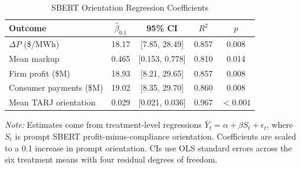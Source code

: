 \begin{table}[!t]
\centering
\caption{SBERT Orientation Regression Coefficients}
\label{tab:dose_response_summary}
\scriptsize
\renewcommand{\arraystretch}{1.05}
\setlength{\tabcolsep}{2.8pt}
\begin{tabular}{@{}lcccc@{}}
\toprule
Outcome & $\hat{\beta}_{0.1}$ & 95\% CI & $R^2$ & $p$ \\
\midrule
$\Delta P$ (\$/MWh) & 18.17 & [7.85, 28.49] & 0.857 & 0.008 \\
Mean markup & 0.465 & [0.153, 0.778] & 0.810 & 0.014 \\
Firm profit (\$M) & 18.93 & [8.21, 29.65] & 0.857 & 0.008 \\
Consumer payments (\$M) & 19.02 & [8.35, 29.70] & 0.860 & 0.008 \\
Mean TARJ orientation & 0.029 & [0.021, 0.036] & 0.967 & $<0.001$ \\
\bottomrule
\end{tabular}

\vspace{0.25em}
\begin{minipage}{0.96\columnwidth}
\footnotesize
\emph{Note:} Estimates come from treatment-level regressions $\bar{Y}_t=\alpha+\beta S_t+\epsilon_t$, where $S_t$ is prompt SBERT profit-minus-compliance orientation. Coefficients are scaled to a 0.1 increase in prompt orientation. CIs use OLS standard errors across the six treatment means with four residual degrees of freedom.
\end{minipage}
\vspace{-0.8em}
\end{table}